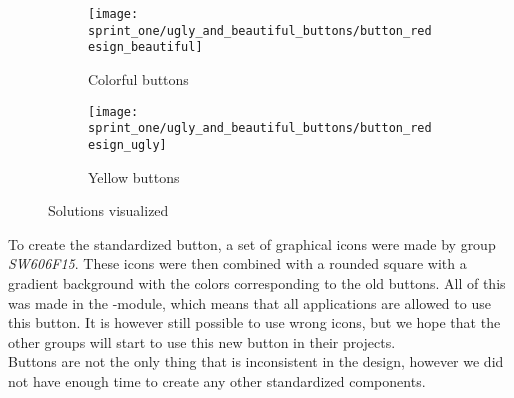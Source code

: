 \begin{figure}[!htbp]
    \centering

    \begin{subfigure}[t]{0.3\textwidth}
    	\centering
        \texttt{[image: sprint\_one/ugly\_and\_beautiful\_buttons/button\_redesign\_beautiful]}
        \caption{Colorful buttons}
        \label{fig:ugly_and_beautiful_buttons_example_one}
    \end{subfigure}
    \hspace{5em} 
    \begin{subfigure}[t]{0.3\textwidth}
    	\centering
        \texttt{[image: sprint\_one/ugly\_and\_beautiful\_buttons/button\_redesign\_ugly]}
        \caption{Yellow buttons}
        \label{fig:ugly_and_beautiful_buttons_example_two}
    \end{subfigure}
    
    \caption{Solutions visualized}
    \label{fig:ugly_and_beautiful_buttons_example_solution}
\end{figure}

To create the standardized button, a set of graphical icons were made by group \emph{SW606F15}. These icons were then combined with a rounded square with a gradient background with the colors corresponding to the old buttons. All of this was made in the \gc-module, which means that all applications are allowed to use this button. It is however still possible to use wrong icons, but we hope that the other groups will start to use this new button in their projects. \\

Buttons are not the only thing that is inconsistent in the design, however we did not have enough time to create any other standardized components. \\
